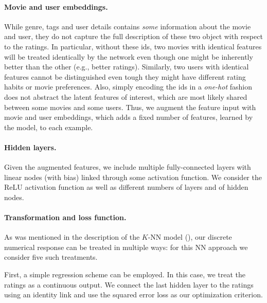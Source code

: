 \documentclass[bj, preprint]{imsart}
\begin{document}
\paragraph{Movie and user embeddings.}\label{par:method.models.nn.embed}

While genre, tags and user details contains \textit{some} information about the movie and user, they do not capture the full description of these two object with respect to the ratings. 
In particular, without these ids, two movies with identical features will be treated identically by the network even though one might be inherently better than the other (e.g., better ratings).
Similarly, two users with identical features cannot be distinguished even tough they might have different rating habits or movie preferences.
Also, simply encoding the ids in a \textit{one-hot} fashion does not abstract the latent features of interest, which are most likely shared between some movies and some users. 
Thus, we augment the feature input with movie and user embeddings, which adds a fixed number of features, learned by the model, to each example. 


\paragraph{Hidden layers.}\label{par:method.models.nn.hidden}

Given the augmented features, we include multiple fully-connected layers with linear nodes (with bias) linked through some activation function. We consider the ReLU activation function as well as different numbers of layers and of hidden nodes.

\paragraph{Transformation and loss function.}\label{par:method.models.nn.transform}

As was mentioned in the description of the $K$-NN model (), our discrete numerical response can be treated in multiple ways: for this NN approach we consider five such treatments.

First, a simple regression scheme can be employed. In this case, we treat the ratings as a continuous output. We connect the last hidden layer to the ratings using an identity link and use the squared error loss as our optimization criterion.
\end{document}
